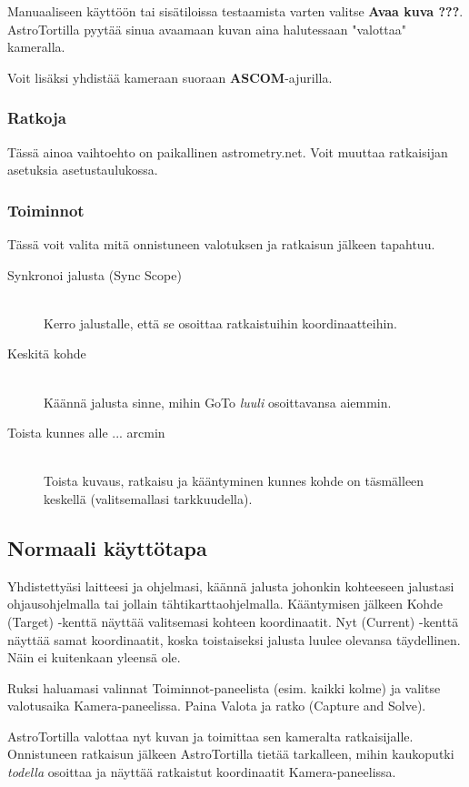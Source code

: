\documentclass{article}
\begin{document}
Manuaaliseen käyttöön tai sisätiloissa testaamista varten valitse \textbf{Avaa kuva ???}. AstroTortilla pyytää sinua avaamaan kuvan aina halutessaan "valottaa" kameralla.

Voit lisäksi yhdistää kameraan suoraan \textbf{ASCOM}-ajurilla.

\subsubsection{Ratkoja}

Tässä ainoa vaihtoehto on paikallinen astrometry.net. Voit muuttaa ratkaisijan asetuksia asetustaulukossa.

\subsubsection{Toiminnot}

Tässä voit valita mitä onnistuneen valotuksen ja ratkaisun jälkeen tapahtuu.
\begin{description}
\item[Synkronoi jalusta (Sync Scope)] \hfill \\
Kerro jalustalle, että se osoittaa ratkaistuihin koordinaatteihin.
\item[Keskitä kohde] \hfill \\
Käännä jalusta sinne, mihin GoTo \emph{luuli} osoittavansa aiemmin.
\item[Toista kunnes alle ... arcmin ] \hfill \\
Toista kuvaus, ratkaisu ja kääntyminen kunnes kohde on täsmälleen keskellä (valitsemallasi tarkkuudella).
\end{description}

\subsection{Normaali käyttötapa}

Yhdistettyäsi laitteesi ja ohjelmasi, käännä jalusta johonkin kohteeseen 
jalustasi ohjausohjelmalla tai jollain tähtikarttaohjelmalla.
Kääntymisen jälkeen Kohde (Target) -kenttä näyttää valitsemasi kohteen koordinaatit. Nyt (Current) -kenttä näyttää samat koordinaatit,
koska toistaiseksi jalusta luulee olevansa täydellinen. Näin ei kuitenkaan yleensä ole.

Ruksi haluamasi valinnat Toiminnot-paneelista (esim. kaikki kolme) ja valitse valotusaika Kamera-paneelissa.
Paina Valota ja ratko (Capture and Solve).

AstroTortilla valottaa nyt kuvan ja toimittaa sen kameralta ratkaisijalle. Onnistuneen
ratkaisun jälkeen AstroTortilla tietää tarkalleen, mihin kaukoputki \emph{todella} osoittaa ja näyttää
ratkaistut koordinaatit Kamera-paneelissa.
\end{document}
